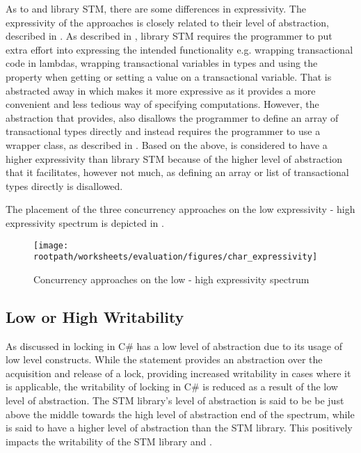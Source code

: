 As to \stmname and library \ac{STM}, there are some differences in expressivity. The expressivity of the approaches is closely related to their level of abstraction, described in . As described in , library \ac{STM} requires the programmer to put extra effort into expressing the intended functionality e.g. wrapping transactional code in lambdas, wrapping transactional variables in  types and using the  property when getting or setting a value on a transactional variable. That is abstracted away in \stmname which makes it more expressive as it provides a more convenient and less tedious way of specifying computations. However, the abstraction that \stmname provides, also disallows the programmer to define an array of transactional types directly and instead requires the programmer to use a wrapper class, as described in . Based on the above, \stmname is considered to have a higher expressivity than library \ac{STM} because of the higher level of abstraction that it facilitates, however not much, as defining an array or list of transactional types directly is disallowed.

The placement of the three concurrency approaches on the low expressivity - high expressivity spectrum is depicted in . 

\begin{figure}[htbp]
\centering
 \texttt{[image: \\rootpath/worksheets/evaluation/figures/char\_expressivity]} 
 \caption{Concurrency approaches on the low - high expressivity spectrum}
\label{fig:char_expressivity}
\end{figure}

\subsection{Low or High Writability}
As discussed in  locking in C\# has a low level of abstraction due to its usage of low level constructs. While the  statement provides an abstraction over the acquisition and release of a lock, providing increased writability in cases where it is applicable, the writability of locking in C\# is reduced as a result of the low level of abstraction. The \ac{STM} library's level of abstraction is said to be be just above the middle towards the high level of abstraction end of the spectrum, while \stmname is said to have a higher level of abstraction than the \ac{STM} library. This positively impacts the writability of the \ac{STM} library and \stmname.

